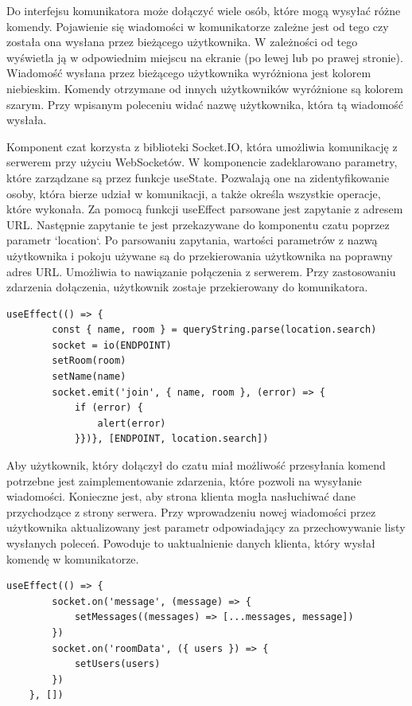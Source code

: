 Do interfejsu komunikatora może dołączyć wiele osób, które mogą wysyłać różne komendy. Pojawienie się wiadomości w komunikatorze zależne jest od tego czy została ona wysłana przez bieżącego użytkownika. W zależności od tego wyświetla ją w odpowiednim miejscu na ekranie (po lewej lub po prawej stronie). Wiadomość wysłana przez bieżącego użytkownika wyróżniona jest kolorem niebieskim. Komendy otrzymane od innych użytkowników wyróżnione są kolorem szarym. Przy wpisanym poleceniu widać nazwę użytkownika, która tą wiadomość wysłała.

Komponent czat korzysta z biblioteki Socket.IO, która umożliwia komunikację z serwerem przy użyciu WebSocketów. W komponencie zadeklarowano parametry, które zarządzane są przez funkcje useState. Pozwalają one na zidentyfikowanie osoby, która bierze udział w komunikacji, a także określa wszystkie operacje, które wykonała. Za pomocą funkcji useEffect parsowane jest zapytanie z adresem URL. Następnie zapytanie te jest przekazywane do komponentu czatu poprzez parametr `location`. Po parsowaniu zapytania, wartości parametrów z nazwą użytkownika i pokoju używane są do przekierowania użytkownika na poprawny adres URL. Umożliwia to nawiązanie połączenia z serwerem. Przy zastosowaniu zdarzenia dołączenia, użytkownik zostaje przekierowany do komunikatora.

\begin{lstlisting}[caption=Implementacja funkcji dolaczenia do komunikatora po stronie klienta]
useEffect(() => {
        const { name, room } = queryString.parse(location.search)
        socket = io(ENDPOINT)
        setRoom(room)
        setName(name)
        socket.emit('join', { name, room }, (error) => {
            if (error) {
                alert(error)
            }})}, [ENDPOINT, location.search])
\end{lstlisting}

Aby użytkownik, który dołączył do czatu miał możliwość przesyłania komend potrzebne jest zaimplementowanie zdarzenia, które pozwoli na wysyłanie wiadomości. Konieczne jest, aby strona klienta mogła nasłuchiwać dane przychodzące z strony serwera. Przy wprowadzeniu nowej wiadomości przez użytkownika aktualizowany jest parametr odpowiadający za przechowywanie listy wysłanych poleceń. Powoduje to uaktualnienie danych klienta, który wysłał komendę w komunikatorze.
\begin{lstlisting}[caption=Implementacja funkcji nasluchiwania wiadomosci i danych przychodzacych od serwera]
useEffect(() => {
        socket.on('message', (message) => {
            setMessages((messages) => [...messages, message])
        })
        socket.on('roomData', ({ users }) => {
            setUsers(users)
        })
    }, [])
\end{lstlisting}

